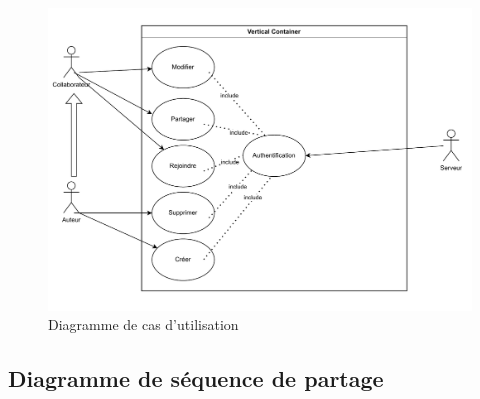 	\begin{figure}[hb]
		\centering

		\includegraphics[scale=.3]{setup/diagramme_de_cas.png}
	\caption{Diagramme de cas d'utilisation}	
	\end{figure}
	\newpage
	
	\subsection{Diagramme de séquence de partage}
	
